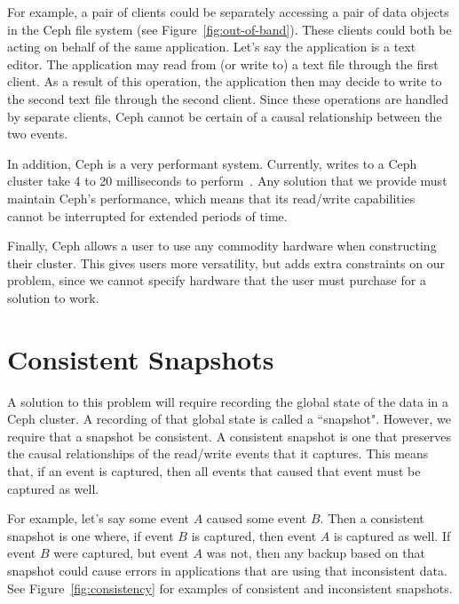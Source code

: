 For example, a pair of clients could be separately accessing a pair of
data objects in the Ceph file system (see
Figure~\ref{fig:out-of-band}). These clients could both be acting on
behalf of the same application. Let's say the application is a text
editor. The application may read from (or write to) a text file
through the first client.  As a result of this operation, the
application then may decide to write to the second text file through
the second client. Since these operations are handled by separate
clients, Ceph cannot be certain of a causal relationship between the
two events.

In addition, Ceph is a very performant system. Currently, writes to a
Ceph cluster take 4 to 20 milliseconds to perform~\citep{Sage}. Any
solution that we provide must maintain Ceph's performance, which means
that its read/write capabilities cannot be interrupted for extended
periods of time.

Finally, Ceph allows a user to use any commodity hardware when
constructing their cluster. This gives users more versatility, but
adds extra constraints on our problem, since we cannot specify
hardware that the user must purchase for a solution to work.

\section{Consistent Snapshots}

A solution to this problem will require recording the global state of
the data in a Ceph cluster. A recording of that global state is called
a ``snapshot". However, we require that a snapshot be consistent.  A
consistent snapshot is one that preserves the causal relationships of
the read/write events that it captures. This means that, if an event
is captured, then all events that caused that event must be captured
as well.

For example, let's say some event $A$ caused some event $B$.  Then a
consistent snapshot is one where, if event $B$ is captured, then event
$A$ is captured as well. If event $B$ were captured, but event $A$ was
not, then any backup based on that snapshot could cause errors in
applications that are using that inconsistent data. See
Figure~\ref{fig:consistency} for examples of consistent and
inconsistent snapshots.

